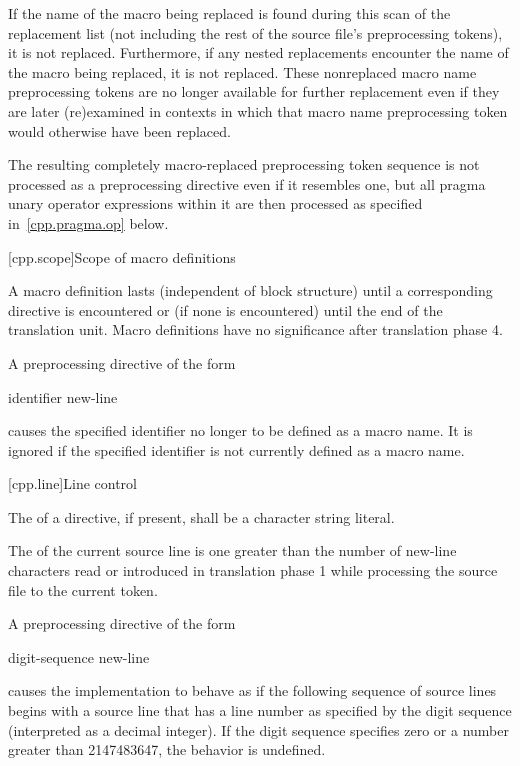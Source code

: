 \pnum
If the name of the macro being replaced is found during this scan of
the replacement list
(not including the rest of the source file's preprocessing tokens),
it is not replaced.
Furthermore,
if any nested replacements encounter the name of the macro being replaced,
it is not replaced.
These nonreplaced macro name preprocessing tokens are no longer available
for further replacement even if they are later (re)examined in contexts
in which that macro name preprocessing token would otherwise have been
replaced.

\pnum
The resulting completely macro-replaced preprocessing token sequence
is not processed as a preprocessing directive even if it resembles one,
but all pragma unary operator expressions within it are then processed as
specified in~\ref{cpp.pragma.op} below.

[cpp.scope]{Scope of macro definitions}%
%

\pnum
A macro definition lasts
(independent of block structure)
until a corresponding
directive is encountered or
(if none is encountered)
until the end of the translation unit.
Macro definitions have no significance after translation phase 4.

\pnum
A preprocessing directive of the form
\begin{ncsimplebnf}
 identifier new-line
%
\end{ncsimplebnf}
causes the specified identifier no longer to be defined as a macro name.
It is ignored if the specified identifier is not currently defined as
a macro name.


[cpp.line]{Line control}%
%

\pnum
The  of a
directive, if present,
shall be a character string literal.

\pnum
The
of the current source line is one greater than
the number of new-line characters read or introduced
in translation phase 1
while processing the source file to the current token.

\pnum
A preprocessing directive of the form
\begin{ncsimplebnf}
 digit-sequence new-line
\end{ncsimplebnf}
causes the implementation to behave as if
the following sequence of source lines begins with a
source line that has a line number as specified
by the digit sequence (interpreted as a decimal integer).
If the digit sequence specifies zero
or a number greater than 2147483647,
the behavior is undefined.

